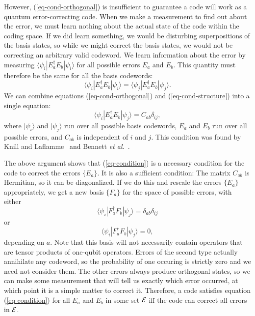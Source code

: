 \documentclass{report}
\newcommand{\ket}[1]{|{#1}\rangle}
\newcommand{\bra}[1]{\langle{#1}|}
\begin{document}
However, (\ref{eq-cond-orthogonal}) is insufficient to guarantee a code will 
work as a quantum error-correcting code.  When we make a measurement to find 
out about the error, we must learn nothing about the actual state of the code 
within the coding space.  If we did learn something, we would be disturbing 
superpositions of the basis states, so while we might correct the basis 
states, we would not be correcting an arbitrary valid codeword.  We learn 
information about the error by measuring $\bra{\psi_i} E_a^\dagger E_b 
\ket{\psi_i}$ for all possible errors $E_a$ and $E_b$.  This quantity must 
therefore be the same for all the basis codewords:
\begin{equation}
\bra{\psi_i} E_a^\dagger E_b \ket{\psi_i} = \bra{\psi_j} E_a^\dagger E_b 
\ket{\psi_j}.
\label{eq-cond-structure}
\end{equation}
We can combine equations (\ref{eq-cond-orthogonal}) and 
(\ref{eq-cond-structure}) into a single equation:
\begin{equation}
\bra{\psi_i} E_a^\dagger E_b \ket{\psi_j} = C_{ab} \delta_{ij},
\label{eq-condition}
\end{equation}
where $\ket{\psi_i}$ and $\ket{\psi_j}$ run over all possible basis 
codewords, $E_a$ and $E_b$ run over all possible errors, and $C_{ab}$ is 
independent of $i$ and $j$.  This condition was found by Knill and 
Laflamme~\cite{knill-laflamme-theory} and Bennett {\it et 
al.}~\cite{bennett-tome}.

The above argument shows that (\ref{eq-condition}) is a necessary 
condition for the code to correct the errors $\{E_a\}$.  It is also a 
sufficient condition:  The matrix $C_{ab}$ is Hermitian, so it can be 
diagonalized.  If we do this and rescale the errors $\{E_a\}$ appropriately, we 
get a new basis $\{F_a\}$ for the space of possible errors, with either
\begin{equation}
\bra{\psi_i} F_a^\dagger F_b \ket{\psi_j} = \delta_{ab} \delta_{ij}
\end{equation}
or
\begin{equation}
\bra{\psi_i} F_a^\dagger F_b \ket{\psi_j} = 0,
\end{equation}
depending on $a$.  Note that this basis will not necessarily contain 
operators that are tensor products of one-qubit operators.  Errors of the 
second type actually annihilate any codeword, so the probability of one 
occuring is strictly zero and we need not consider them.  The other errors 
always produce orthogonal states, so we can make some measurement that 
will tell us exactly which error occurred, at which point it is a simple 
matter to correct it.  Therefore, a code satisfies equation 
(\ref{eq-condition}) for all $E_a$ and $E_b$ in some set ${\cal E}$ iff the
code can correct all errors in ${\cal E}$.
\end{document}
